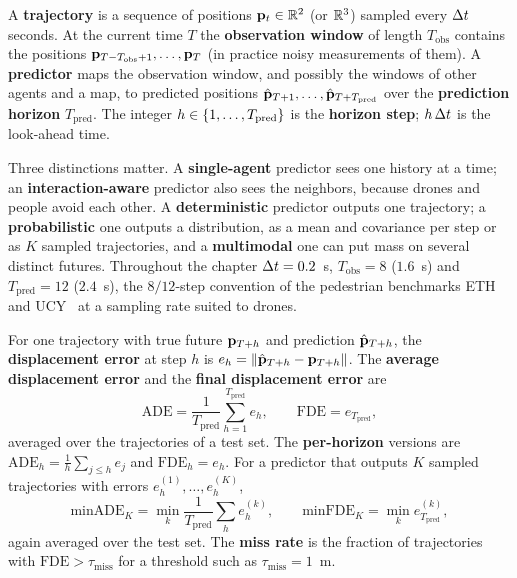 \begin{definition}
\label{def:ch20-problem}
A \textbf{trajectory} is a sequence of positions
$\mathbf{p}_t \in \mathbb{R}^2$ (or $\mathbb{R}^3$) sampled every $\Delta t$ seconds. At the current time
$T$ the \textbf{observation window} of length $T_{\mathrm{obs}}$ contains the
positions $\mathbf{p}_{T - T_{\mathrm{obs}} + 1}, \dots, \mathbf{p}_T$ (in practice noisy
measurements of them). A \textbf{predictor} maps the observation window, and
possibly the windows of other agents and a map, to predicted positions
$\hat{\mathbf{p}}_{T+1}, \dots, \hat{\mathbf{p}}_{T+T_{\mathrm{pred}}}$ over the
\textbf{prediction horizon} $T_{\mathrm{pred}}$. The
integer $h \in \left\{ 1, \dots, T_{\mathrm{pred}} \right\}$ is the \textbf{horizon step};
$h\,\Delta t$ is the look-ahead time.
\end{definition}

Three distinctions matter. A \textbf{single-agent} predictor sees one history
at a time; an \textbf{interaction-aware}
predictor also sees the neighbors, because drones and people avoid each
other. A \textbf{deterministic} predictor outputs one trajectory; a
\textbf{probabilistic} one outputs a distribution, as a mean and covariance
per step or as $K$ sampled trajectories, and a
\textbf{multimodal} one can put mass on several
distinct futures. Throughout the chapter $\Delta t = 0.2$~s, $T_{\mathrm{obs}} = 8$
($1.6$~s) and $T_{\mathrm{pred}} = 12$ ($2.4$~s), the $8/12$-step convention of
the pedestrian benchmarks ETH~\cite{pellegrini2009you} and
UCY~\cite{lerner2007crowds} at a sampling rate suited to drones.

\begin{definition}
\label{def:ch20-metrics}
For one trajectory with true future $\mathbf{p}_{T+h}$ and prediction
$\hat{\mathbf{p}}_{T+h}$, the \textbf{displacement error} at step $h$ is
$e_h = \left\lVert \hat{\mathbf{p}}_{T+h} - \mathbf{p}_{T+h} \right\rVert$. The \textbf{average displacement
error} and the \textbf{final
displacement error} are
\begin{equation}
  \mathrm{ADE} = \frac{1}{T_{\mathrm{pred}}} \sum_{h=1}^{T_{\mathrm{pred}}} e_h,
  \qquad
  \mathrm{FDE} = e_{T_{\mathrm{pred}}} ,
  \label{eq:ch20-ade-fde}
\end{equation}
averaged over the trajectories of a test set. The \textbf{per-horizon}
versions are $\mathrm{ADE}_h = \frac{1}{h}\sum_{j \le h} e_j$ and
$\mathrm{FDE}_h = e_h$. For a predictor that outputs $K$ sampled trajectories
with errors $e_h^{(1)}, \dots, e_h^{(K)}$,
\begin{equation}
  \mathrm{minADE}_K = \min_{k} \frac{1}{T_{\mathrm{pred}}} \sum_{h} e_h^{(k)},
  \qquad
  \mathrm{minFDE}_K = \min_{k} e_{T_{\mathrm{pred}}}^{(k)},
  \label{eq:ch20-minade}
\end{equation}
%
again averaged over the test set. The \textbf{miss rate} is the fraction of
trajectories with $\mathrm{FDE} > \tau_{\mathrm{miss}}$ for a threshold such as
$\tau_{\mathrm{miss}} = 1$~m.
\end{definition}

